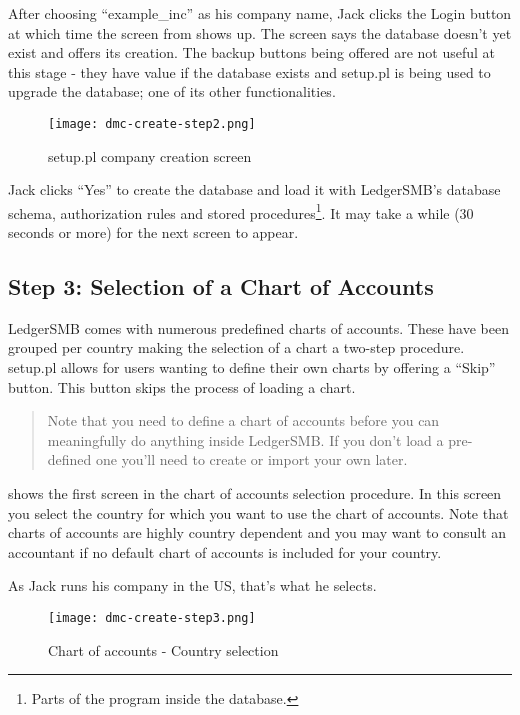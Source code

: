 After choosing ``example\_inc'' as his company name, Jack clicks the Login button at which
time the screen from  shows up. The screen says the database doesn't
yet exist and offers its creation. The backup buttons being offered are not useful at this
stage - they have value if the database exists and setup.pl is being used to upgrade
the database; one of its other functionalities.

\begin{figure}[h]
\centering
\texttt{[image: dmc-create-step2.png]}
\caption{setup.pl company creation screen}
\label{fig:setup-step2}
\end{figure}

Jack clicks ``Yes'' to create the database and load it with LedgerSMB's database
schema, authorization rules and stored
procedures\footnote{Parts of the program inside the database.}. It may
take a while (30 seconds or more) for the next screen to appear.

\subsection{Step 3: Selection of a Chart of Accounts}

LedgerSMB comes with numerous predefined charts of accounts. These have been grouped
per country making the selection of a chart a two-step procedure. setup.pl allows for
users wanting to define their own charts by offering a ``Skip'' button. This button
skips the process of loading a chart.

\begin{quote}
Note that you need to define a chart of accounts before you can meaningfully do anything
inside LedgerSMB. If you don't load a pre-defined one you'll need to create or import your
own later.
\end{quote}

 shows the first screen in the chart of accounts selection procedure.
In this screen you select the country for which you want to use the chart of accounts. Note
that charts of accounts are highly country dependent and you may want to consult
an accountant if no default chart of accounts is included for your country.

As Jack runs his company in the US, that's what he selects.

\begin{figure}[h]
\centering
\texttt{[image: dmc-create-step3.png]}
\caption{Chart of accounts - Country selection}
\label{fig:setup-step3}
\end{figure}

